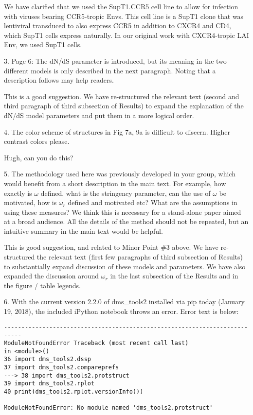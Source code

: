 \documentclass[11pt, oneside]{article}   	%
\begin{document}
{\color{black}
We have clarified that we used the SupT1.CCR5 cell line to allow for infection with viruses bearing CCR5-tropic Envs. This cell line is a SupT1 clone that was lentiviral transduced to also express CCR5 in addition to CXCR4 and CD4, which SupT1 cells express naturally. In our original work with CXCR4-tropic LAI Env, we used SupT1 cells. 
}

3. Page 6: The dN/dS parameter is introduced, but its meaning in the two different models is only described in the next paragraph. Noting that a description follows may help readers. 

{\color{black}
This is a good suggestion.
We have re-structured the relevant text (second and third paragraph of third subsection of Results) to expand the explanation of the dN/dS model parameters and put them in a more logical order.}

4. The color scheme of structures in Fig 7a, 9a is difficult to discern. Higher contrast colors please. 

{\color{red}
Hugh, can you do this?}

5. The methodology used here was previously developed in your group, which would benefit from a short description in the main text. For example, how exactly is $\omega$ defined, what is the stringency parameter, can the use of $\omega$ be motivated, how is $\omega_r$ defined and motivated etc? What are the assumptions in using these measures? We think this is necessary for a stand-alone paper aimed at a broad audience. All the details of the method should not be repeated, but an intuitive summary in the main text would be helpful. 

{\color{black}
This is good suggestion, and related to Minor Point \#3 above.
We have re-structured the relevant text (first few paragraphs of third subsection of Results) to substantially expand discussion of these models and parameters.
We have also expanded the discussion around $\omega_r$ in the last subsection of the Results and in the figure / table legends.}

6. With the current version 2.2.0 of dms\_tools2 installed via pip today (January 19, 2018), the included iPython notebook throws an error. Error text is below: 
\begin{verbatim}
--------------------------------------------------------------------------- 
ModuleNotFoundError Traceback (most recent call last) 
in <module>() 
36 import dms_tools2.dssp 
37 import dms_tools2.compareprefs 
---> 38 import dms_tools2.protstruct 
39 import dms_tools2.rplot 
40 print(dms_tools2.rplot.versionInfo()) 

ModuleNotFoundError: No module named 'dms_tools2.protstruct'
\end{verbatim}
\end{document}
